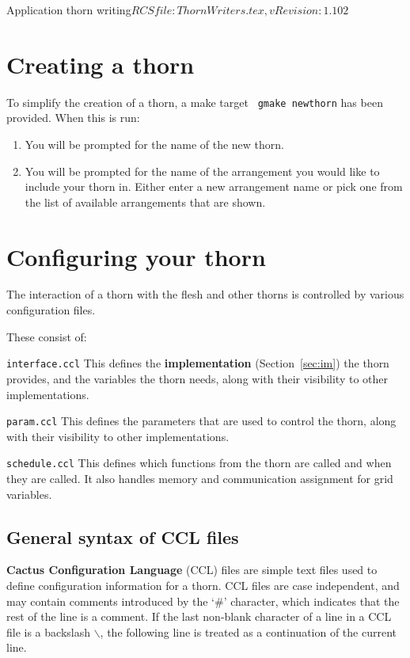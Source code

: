 \begin{cactuspart}{2}{Application thorn writing}{$RCSfile: ThornWriters.tex,v $}{$Revision: 1.102 $}
\section{Creating a thorn}


To simplify the creation of a thorn, a make target {\tt
gmake newthorn} has been provided. When this is run:

\begin{enumerate}
\item{} You will be prompted for the name of the new thorn.
\item{} You will be prompted for the name of the arrangement you would
like to include your thorn in. Either enter a new arrangement name or pick
one from the list of available arrangements that are shown.
\end{enumerate}


\section{Configuring your thorn}

The interaction of a thorn with the flesh and other thorns is controlled
by various configuration files.

These consist of:

\begin{Lentry}

\item [{\tt interface.ccl}]
This defines the {\bf implementation} (Section~\ref{sec:im}) the thorn
provides, and the variables the thorn needs, along with their
visibility to other implementations.

\item [{\tt param.ccl}]
This defines the parameters that are used to control the thorn, along
with their visibility to other implementations.

\item [{\tt schedule.ccl}]
This defines which functions from the thorn are called and when they are
called. It also handles memory and communication assignment for grid variables.

\end{Lentry}

\subsection{General syntax of CCL files}

{\bf Cactus Configuration Language} (CCL) files are simple text files
used to define configuration information for a thorn.  CCL files are
case independent, and may contain comments introduced by the `\#' character,
which indicates that the rest of the line is a comment. If the last non-blank character of a line in a CCL file is a backslash {\tt $\backslash$}, the following line is treated as a continuation of the current line.


\end{cactuspart}

